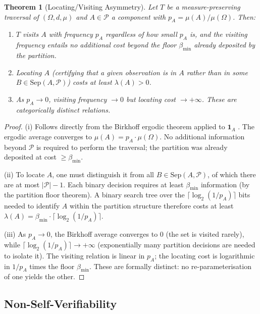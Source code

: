 \documentclass[12pt,a4paper,twocolumn]{article}
\theoremstyle{plain}
\newtheorem{theorem}{Theorem}[section]
\theoremstyle{definition}
\theoremstyle{remark}
\newcommand{\Part}{\mathcal{P}}
\newcommand{\Sep}{\mathrm{Sep}}
\newcommand{\bmin}{\beta_{\min}}
\newcommand{\BRS}{(\Omega,d,\mu)}
\begin{document}
\begin{theorem}[Locating/Visiting Asymmetry]
\label{thm:locating-visiting}
Let $T$ be a measure-preserving traversal of $\BRS$ and $A \in \Part$ a
component with $p_A = \mu(A)/\mu(\Omega)$.  Then:
\begin{enumerate}[label=(\roman*)]
  \item $T$ visits $A$ with frequency $p_A$ regardless of how small $p_A$
    is, and the visiting frequency entails no additional cost beyond the
    floor $\bmin$ already deposited by the partition.
  \item Locating $A$ (certifying that a given observation is in $A$ rather
    than in some $B \in \Sep(A,\Part)$) costs at least $\lambda(A) > 0$.
  \item As $p_A \to 0$, visiting frequency $\to 0$ but locating cost
    $\to +\infty$.  These are categorically distinct relations.
\end{enumerate}
\end{theorem}

\begin{proof}
(i) Follows directly from the Birkhoff ergodic theorem applied to
$\mathbf{1}_A$ \citep{halmos1950measure}.  The ergodic average converges to
$\mu(A) = p_A \cdot \mu(\Omega)$.  No additional information beyond
$\Part$ is required to perform the traversal; the partition was already
deposited at cost $\geq \bmin$.

(ii) To locate $A$, one must distinguish it from all $B \in \Sep(A,\Part)$,
of which there are at most $|\Part| - 1$.  Each binary decision requires at
least $\bmin$ information (by the partition floor theorem).  A binary search
tree over the $\lceil\log_2(1/p_A)\rceil$ bits needed to identify $A$ within
the partition structure therefore costs at least $\lambda(A) = \bmin \cdot
\lceil\log_2(1/p_A)\rceil$.

(iii) As $p_A \to 0$, the Birkhoff average converges to $0$ (the set is
visited rarely), while $\lceil\log_2(1/p_A)\rceil \to +\infty$ (exponentially
many partition decisions are needed to isolate it).  The visiting relation is
linear in $p_A$; the locating cost is logarithmic in $1/p_A$ times the floor
$\bmin$.  These are formally distinct: no re-parameterisation of one yields the
other.
\end{proof}

\subsection{Non-Self-Verifiability}
\end{document}
